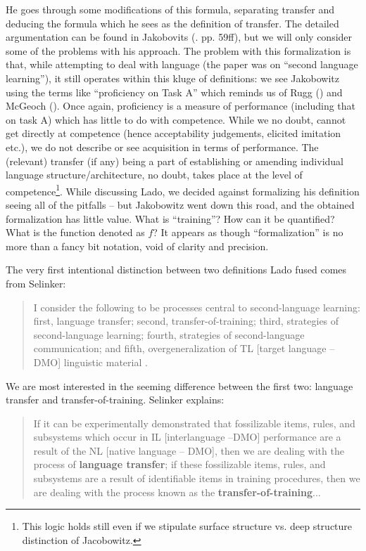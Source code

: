 \documentclass{article}
\begin{document}
He goes through some modifications of this formula, separating transfer and deducing the formula which he sees as the definition of transfer. The detailed argumentation can be found in Jakobovits (\citeyear{jakobovits_second_1969}. pp. 59ff), but we will only consider some of the problems with his approach. The problem with this formalization is that, while attempting to deal with language (the paper was on ``second language learning''), it still operates within this kluge of definitions: we see Jakobowitz using the terms like ``proficiency on Task A'' which reminds us of Rugg (\citeyear{rugg_experimental_1916}) and McGeoch (\citeyear{mcgeoch_psychology_1942}). Once again, proficiency is a measure of performance (including that on task A) which has little to do with competence. While we no doubt, cannot get directly at competence (hence acceptability judgements, elicited imitation etc.), we do not describe or see acquisition in terms of performance. The (relevant) transfer (if any) being a part of establishing or amending individual language structure/architecture, no doubt, takes place at the level of competence\footnote{This logic holds still even if we stipulate surface structure vs. deep structure distinction of Jacobowitz.}. While discussing Lado, we decided against formalizing his definition seeing all of the pitfalls -- but Jakobowitz went down this road, and the obtained formalization has little value. What is ``training''? How can it be quantified? What is the function denoted as $f$? It appears as though ``formalization'' is no more than a fancy bit notation, void of clarity and precision.

The very first intentional distinction between two definitions Lado fused comes from Selinker: 

\begin{quote}
    I consider the following to be processes central to second-language learning: first, language transfer; second, transfer-of-training; third, strategies of second-language learning; fourth, strategies of second-language communication; and fifth, overgeneralization of TL [target language -- DMO] linguistic material \citep[][p. 216]{selinker_interlanguage_1972}.
\end{quote}

We are most interested in the seeming difference between the first two: language  transfer and transfer-of-training. Selinker explains:

\begin{quote}
    If it can be experimentally demonstrated that fossilizable items, rules, and subsystems which occur in IL [interlanguage --DMO] performance are a result of the NL [native language -- DMO], then we are dealing with the process of \textbf{language transfer}; if these fossilizable items, rules, and subsystems are a result of identifiable items in training procedures, then we are dealing with the process known as the \textbf{transfer-of-training}... \citep[][p. 216, emphasis added]{selinker_interlanguage_1972}
\end{quote}
\end{document}
